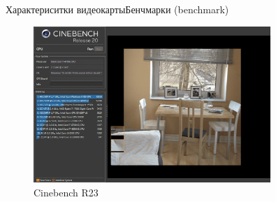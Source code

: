 \documentclass{beamer}
\begin{document}
\begin{frame}{Характериситки видеокарты}{Бенчмарки (benchmark)} 
	\begin{figure} 
		\includegraphics[width=0.8\textwidth]{images/Cinebench.png}
		\caption {Cinebench R23}
	\end{figure}
	

\end{frame}
\end{document}
